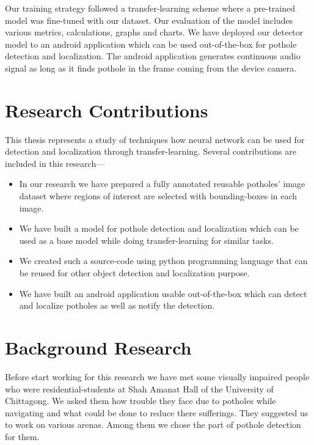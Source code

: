     Our training strategy followed a transfer-learning scheme where a pre-trained model was fine-tuned with our dataset.
    Our evaluation of the model includes various metrics, calculations, graphs and charts. We have deployed our detector model to an android application which can be used out-of-the-box for pothole detection and localization. The android application generates continuous audio signal as long as it finds pothole in the frame coming from the device camera.
    
\section{Research Contributions}
    This thesis represents a study of techniques how neural network can be used for detection and localization through transfer-learning. Several contributions are included in this research---
    \begin{itemize}
        \item{In our research we have prepared a fully annotated reusable potholes' image dataset where regions of interest are selected with bounding-boxes in each image.}
        \item{We have built a model for pothole detection and localization which can be used as a base model while doing transfer-learning for similar tasks.}
        \item{We created such a source-code using python programming language that can be reused for other object detection and localization purpose.}
        \item{We have built an android application usable out-of-the-box which can detect and localize potholes as well as notify the detection.}
    \end{itemize}
    
\section{Background Research}
    Before start working for this research we have met some visually impaired people who were residential-students at Shah Amanat Hall of the University of Chittagong. We asked them how trouble they face due to potholes while navigating and what could be done to reduce there sufferings. They suggested us to work on various arenas. Among them we chose the part of pothole detection for them.
    
